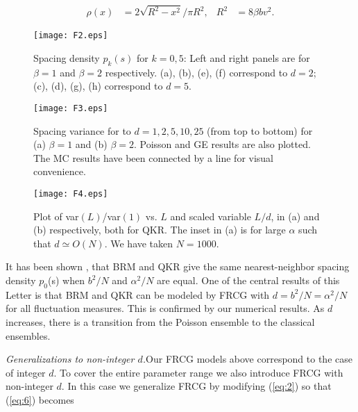 \documentclass[reprint,amsmath,amssymb,showpacs,aps,]{revtex4-1}
\begin{document}
{\begin{align}\label{eq:30}
\rho(x)&=2\sqrt{R^{2}-x^{2}}/\pi R^{2}, &  R^{2}&=8\beta b v^{2}.
\end{align}
\par
\begin{figure}
\begin{center}
\texttt{[image: F2.eps]}
\caption{Spacing density $p_k(s)$ for $k=0,5$: Left and right panels are for $\beta=1$ and $\beta=2$ respectively. (a), (b), (e), (f) correspond to $d=2$; (c), (d), (g), (h) correspond to $d=5$.}
\label{fig:F2}
\end{center}
\end{figure}
\begin{figure}
\begin{center}
\texttt{[image: F3.eps]}
\caption{Spacing variance for to  $d=1,2,5, 10, 25$ (from top to bottom) for (a) $\beta=1$ and (b) $\beta=2$. Poisson and GE results are also plotted. The MC results have been connected by a line for visual convenience.}
\label{fig:F3}
\end{center}
\end{figure}
\begin{figure}
\begin{center}
\texttt{[image: F4.eps]}
\caption{Plot of var$(L)$/var$(1)$ vs. $L$ and scaled variable $L/d$, in (a) and (b) respectively, both for QKR. The inset in (a) is for large $\alpha$ such that $d\simeq O(N)$. We have taken $N=1000$.}\label{fig:F4}
\end{center}
\end{figure}
It has been shown \cite{CMI,CGIS,CIM,FM2}, that BRM and QKR give the same nearest-neighbor spacing density $p_{0}$(s) when $b^{2}/N$ and $\alpha^{2}/N$ are equal. One of the central results of this Letter is that BRM and QKR can be modeled by FRCG with $d= b^{2}/N=\alpha^{2}/N$ for all fluctuation measures. This is confirmed by our numerical results. As $d$ increases, there is a transition from the Poisson ensemble to the classical ensembles. \par
\textit{Generalizations to non-integer $d$.}\textemdash Our FRCG models above correspond to the case of integer $d$. To cover the entire parameter range we also introduce FRCG with non-integer $d$. In this case we generalize FRCG by modifying (\ref{eq:2}) so that (\ref{eq:6}) becomes
}
\end{document}
